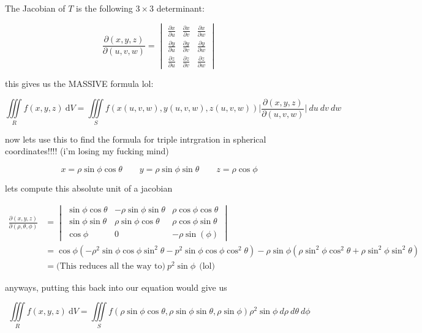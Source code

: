 \documentclass{article}
\begin{document}
The Jacobian of $T$ is the following $3 \times 3 $ determinant:

$$\frac{\partial(x,y,z)}{\partial(u,v,w)} = \begin{vmatrix}
    \frac{\partial x}{\partial u} & \frac{\partial x}{\partial v} & \frac{\partial x}{ \partial w} \\[6pt]
    \frac{\partial y}{\partial u} & \frac{\partial y}{ \partial v} & \frac{\partial y}{ \partial w} \\[6pt]
    \frac{\partial z}{ \partial u} & \frac{\partial z }{\partial v} & \frac{\partial z}{ \partial w} 
\end{vmatrix}$$

this gives us the MASSIVE formula lol:

$$\iiint\limits_{R} f(x,y,z) \ \mathrm{d}V = \iiint\limits_{S} f(x(u,v,w), y(u,v,w), z(u,v,w)) \bigg\rvert \frac{\partial(x,y,z)}{\partial(u,v,w)} \bigg\rvert \ du \ dv \ dw$$

now lets use this to find the formula for triple intrgration in spherical coordinates!!!! (i'm losing my fucking mind) 

$$x =  \rho \sin{\phi} \cos{\theta} \qquad y = \rho \sin{\phi} \sin{\theta} \qquad z = \rho \cos{\phi}$$

lets compute this absolute unit of a jacobian 

\begin{align*}
    \frac{\partial(x,y,z)}{\partial(\rho,\theta,\phi)} &= \begin{vmatrix}
    \sin{\phi}\cos{\theta}  & -\rho\sin{\phi}\sin{\theta}  & \rho \cos{\phi} \cos{\theta} \\[6pt]
    \sin{\phi}\sin{\theta}   & \rho \sin{\phi} \cos{\theta} & \rho \cos{\phi}\sin{\theta}  \\[6pt]
    \cos{\phi}  & 0 & - \rho \sin(\phi)    
    \end{vmatrix} \\ 
    & = \cos{\phi} (-\rho^2\sin{\phi}\cos{\phi}\sin^2{\theta} - p^2\sin{\phi}\cos{\phi}\cos^2{\theta}) - \rho\sin{\phi} (\rho \sin^2{\phi}\cos^2{\theta + \rho \sin^2{\phi} \sin^2{\theta}}) \\ 
    & = \text{(This reduces all the way to)}  \ p^2\sin{\phi}  \ \ \text{(lol)} 
\end{align*}

anyways, putting this back into our equation would give us

$$\iiint\limits_{R}f(x,y,z) \ \mathrm{d}V = \iiint\limits_{S} f(\rho\sin{\phi}\cos{\theta}, \rho\sin{\phi}\sin{\theta}, \rho\sin{\phi}) \rho^2 \sin{\phi} \ d\rho \ d\theta \ d\phi$$
\end{document}

